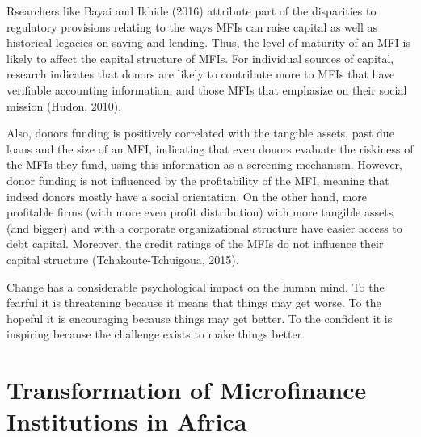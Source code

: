 \documentclass[a4paper, nobind]{templates/ociamthesis}
\begin{document}
Rsearchers like Bayai and Ikhide (2016) attribute part of the disparities to regulatory provisions relating to the ways MFIs can raise capital as well as historical legacies on saving and lending. Thus, the level of maturity of an MFI is likely to affect the capital structure of MFIs. For individual sources of capital, research indicates that donors are likely to contribute more to MFIs that have verifiable accounting information, and those MFIs that emphasize on their social mission (Hudon, 2010).

Also, donors funding is positively correlated with the tangible assets, past due loans and the size of an MFI, indicating that even donors evaluate the riskiness of the MFIs they fund, using this information as a screening mechanism. However, donor funding is not influenced by the profitability of the MFI, meaning that indeed donors mostly have a social orientation. On the other hand, more profitable firms (with more even profit distribution) with more tangible assets (and bigger) and with a corporate organizational structure have easier access to debt capital. Moreover, the credit ratings of the MFIs do not influence their capital structure (Tchakoute-Tchuigoua, 2015).

\begin{savequote}
Change has a considerable psychological impact on the human mind. To the
fearful it is threatening because it means that things may get worse. To
the hopeful it is encouraging because things may get better. To the
confident it is inspiring because the challenge exists to make things
better.
\end{savequote}



\hypertarget{transformation-of-microfinance-institutions-in-africa}{%
\chapter{Transformation of Microfinance Institutions in Africa}\label{transformation-of-microfinance-institutions-in-africa}}

\minitoc 
\end{document}
